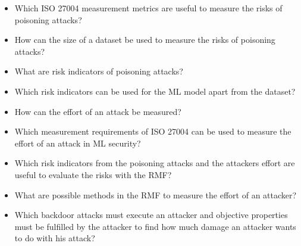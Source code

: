 \begin{itemize}
  \item Which ISO 27004 measurement metrics are useful to measure the risks of poisoning attacks?
  \item How can the size of a dataset be used to measure the risks of poisoning attacks?
  \item What are risk indicators of poisoning attacks?
  \item Which risk indicators can be used for the ML model apart from the dataset?
  \item How can the effort of an attack be measured?
  \item Which measurement requirements of ISO 27004 can be used to measure the effort of an attack in ML security?
  \item Which risk indicators from the poisoning attacks and the attackers effort are useful to evaluate the risks with the RMF?
  \item What are possible methods in the RMF to measure the effort of an attacker?
  \item Which backdoor attacks must execute an attacker and objective properties must be fulfilled by the attacker to find how much damage an attacker wants to do with his attack?
\end{itemize}
